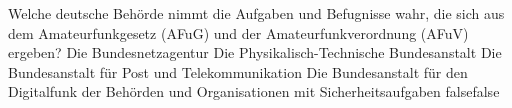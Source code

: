     {Welche deutsche Behörde nimmt die Aufgaben und Befugnisse wahr, die sich aus dem Amateurfunkgesetz (AFuG) und der Amateurfunkverordnung (AFuV) ergeben?}
    {Die Bundesnetzagentur}
    {Die Physikalisch-Technische Bundesanstalt}
    {Die Bundesanstalt für Post und Telekommunikation}
    {Die Bundesanstalt für den Digitalfunk der Behörden und Organisationen mit Sicherheitsaufgaben}
    {false}{false}